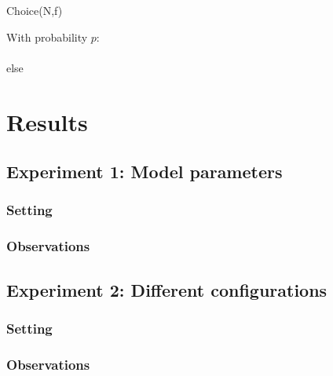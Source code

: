 \documentclass[11pt]{article}
\begin{document}
\begin{algorithm}[H]
    \SetAlgoLined
    \caption{Choice(N,f)}
    With probability $p$:\\
    \\
    else\\
\end{algorithm}

\section{Results}

\subsection{Experiment 1: Model parameters}

\subsubsection{Setting}

\subsubsection{Observations}

\subsection{Experiment 2: Different configurations}

\subsubsection{Setting}

\subsubsection{Observations}
\end{document}
